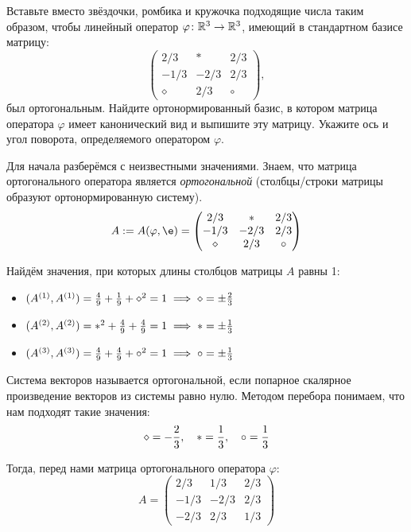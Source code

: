 \begin{condition}
    Вставьте вместо звёздочки, ромбика и кружочка подходящие числа таким образом, чтобы линейный оператор $\varphi \colon \mathbb{R}^3 \to \mathbb{R}^3$, имеющий в стандартном базисе матрицу:
    \[
        \begin{pmatrix}
            2/3      & *    & 2/3   \\
            -1/3     & -2/3 & 2/3   \\
            \diamond & 2/3  & \circ
        \end{pmatrix},
    \]
    был ортогональным. Найдите ортонормированный базис, в котором матрица оператора $\varphi$ имеет канонический вид и выпишите эту матрицу. Укажите ось и угол поворота, определяемого оператором $\varphi$.
\end{condition}

Для начала разберёмся с неизвестными значениями. Знаем, что матрица ортогонального оператора является \textit{ортогональной} (столбцы/строки матрицы образуют ортонормированную систему).
\[
    A := A(\varphi, \e)
    =
    \begin{pmatrix}
        2/3      & *    & 2/3   \\
        -1/3     & -2/3 & 2/3   \\
        \diamond & 2/3  & \circ
    \end{pmatrix}
\]

Найдём значения, при которых длины столбцов матрицы $A$ равны 1:
\begin{itemize}
    \item $(A^{(1)}, A^{(1)}) = \frac{4}{9} + \frac{1}{9} + \diamond^2 = 1 \implies \diamond = \pm \frac{2}{3}$

    \item $(A^{(2)}, A^{(2)}) = *^2 + \frac{4}{9} + \frac{4}{9} = 1 \implies * = \pm \frac{1}{3}$

    \item $(A^{(3)}, A^{(3)}) = \frac{4}{9} + \frac{4}{9} + \circ^2 = 1 \implies \circ = \pm \frac{1}{3}$
\end{itemize}

Система векторов называется ортогональной, если попарное скалярное произведение векторов из системы равно нулю. Методом перебора понимаем, что нам подходят такие значения:
\[
    \diamond = -\frac{2}{3},
    \quad
    * = \frac{1}{3},
    \quad
    \circ = \frac{1}{3}
\]

Тогда, перед нами матрица ортогонального оператора $\varphi$:
\[
    A =
    \begin{pmatrix}
        2/3  & 1/3  & 2/3 \\
        -1/3 & -2/3 & 2/3 \\
        -2/3 & 2/3  & 1/3
    \end{pmatrix}
\]

